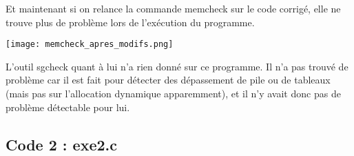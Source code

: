 Et maintenant si on relance la commande memcheck sur le code corrigé, elle ne trouve plus de problème lors de l'exécution du programme.
\begin{center} 
\hspace{15cm}
\texttt{[image: memcheck\_apres\_modifs.png]}
\end{center}
\vspace{0.5cm}

L'outil sgcheck quant à lui n'a rien donné sur ce programme. Il n'a pas trouvé de problème car il est fait pour détecter des dépassement de pile ou de tableaux (mais pas sur l'allocation dynamique apparemment), et il n'y avait donc pas de problème détectable pour lui.\\

\subsection{Code 2 : exe2.c}


